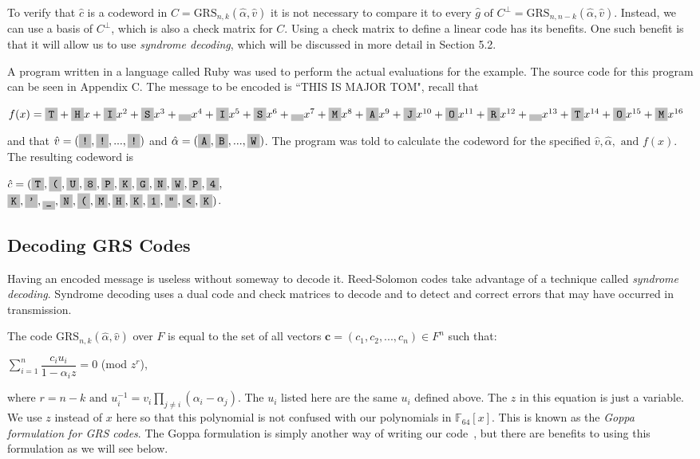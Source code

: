 \documentclass{article}
\begin{document}
To verify that $\hat{c}$ is a codeword in $C = \text{GRS}_{n,k}(\hat{\alpha}, \hat{v})$ it is not necessary to compare it to every $\hat{g} \text{ of } C^{\perp} = \text{GRS}_{n,n-k}(\hat{\alpha}, \hat{v})$. Instead, we can use a basis of $C^{\perp}$, which is also a check matrix for $C$. Using a check matrix to define a linear code has its benefits. One such benefit is that it will allow us to use \textit{syndrome decoding}, which will be discussed in more detail in Section 5.2.

A program written in a language called Ruby was used to perform the actual evaluations for the example. The source code for this program can be seen in Appendix C. The message to be encoded is ``THIS IS MAJOR TOM", recall that 
\begin{center}
$f(x) = \f{T} + \f{H}x + \f{I}x^{2} + \f{S}x^{3} + \f{ }x^{4} + \f{I}x^{5} + \f{S}x^{6} + \f{ }x^{7} + \f{M}x^{8} + \f{A}x^{9} + \f{J}x^{10} + \f{O}x^{11} + \f{R}x^{12} + \f{ }x^{13} + \f{T}x^{14} + \f{O}x^{15} + \f{M}x^{16}$
\end{center}
and that $\hat{v} = (\f{!}, \f{!}, ..., \f{!})$ and $\hat{\alpha} = (\f{A}, \f{B}, ..., \f{W})$. The program was told to calculate the codeword for the specified $\hat{v}, \hat{\alpha}, \text{ and } f(x)$. The resulting codeword is
\begin{center}
$\hat{c} = (\f{T}, \f{(}, \f{U}, \f{8}, \f{P}, \f{K}, \f{G}, \f{N}, \f{W}, \f{P}, \f{4}, $\\
    \hspace*{5ex}   $\f{K}, \f{'}, \f{\_}, \f{N}, \f{(}, \f{M}, \f{H}, \f{K}, \f{1}, \f{"}, \f{<}, \f{K})$.
\end{center}


\subsection{Decoding GRS Codes}
Having an encoded message is useless without someway to decode it. Reed-Solomon codes take advantage of a technique called \textit{syndrome decoding}. Syndrome decoding uses a dual code and check matrices to decode and to detect and correct errors that may have occurred in transmission.

The code $\text{GRS}_{n,k}(\hat{\alpha}, \hat{v})$ over $F$ is equal to the set of all vectors $\textbf{c} = (c_{1},c_{2},...,c_{n}) \in F^{n}$ such that:
\begin{center}
$\sum\limits_{i = 1}^{n} \dfrac{c_{i}u_{i}}{1 - \alpha_{i}z} = 0$ (mod $z^{r}$),
\end{center}
where $r = n - k \text{ and } u_{i}^{-1} = v_{i}\prod\limits_{j \neq i} (\alpha_{i} - \alpha_{j})$. The $u_{i}$ listed here are the same $u_{i}$ defined above. The $z$ in this equation is just a variable. We use $z$ instead of $x$ here so that this polynomial is not confused with our polynomials in $\mathbb{F}_{64}[x]$.  This is known as the \textit{Goppa formulation for GRS codes}. The Goppa formulation is simply another way of writing our code~\cite{Hall:2012}, but there are benefits to using this formulation as we will see below.
\end{document}
